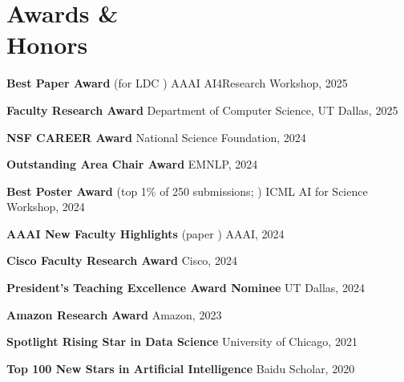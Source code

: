\vspace{-1mm}
\section{Awards \& \\Honors}

\noindent \textbf{Best Paper Award} {\small (for LDC )} \hfill AAAI AI4Research Workshop, 2025

\vspace{-2mm}
\noindent \textbf{Faculty Research Award} \hfill Department of Computer Science, UT Dallas, 2025

\vspace{-2mm}
\noindent \textbf{NSF CAREER Award} \hfill National Science Foundation, 2024

\vspace{-2mm}
\noindent \textbf{Outstanding Area Chair Award} \hfill EMNLP, 2024

\vspace{-2mm}
\noindent \textbf{Best Poster Award} {\small (top 1\% of 250 submissions; )} \hfill ICML AI for Science Workshop, 2024

\vspace{-2mm}
\noindent \textbf{AAAI New Faculty Highlights} {\small (paper )} \hfill AAAI, 2024

\vspace{-2mm}
\noindent \textbf{Cisco Faculty Research Award} \hfill Cisco, 2024

\vspace{-2mm}
\noindent \textbf{President's Teaching Excellence Award Nominee} \hfill UT Dallas, 2024

\vspace{-2mm}
\noindent \textbf{Amazon Research Award} \hfill Amazon, 2023

\vspace{-2mm}
\noindent \textbf{Spotlight Rising Star in Data Science} \hfill University of Chicago, 2021

\vspace{-2mm}
\noindent \textbf{Top 100 New Stars in Artificial Intelligence} \hfill Baidu Scholar, 2020

